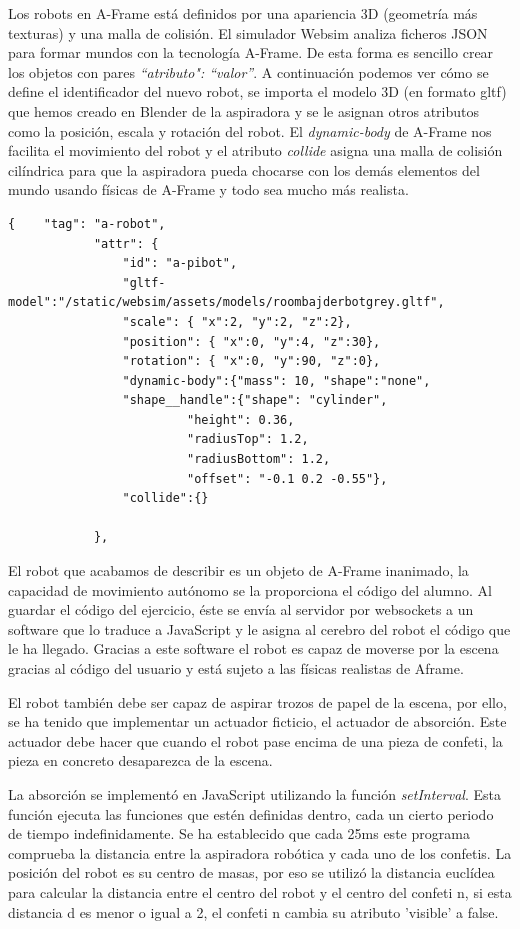 Los robots en A-Frame está definidos por una apariencia 3D (geometría más texturas) y una malla de colisión.
El simulador Websim analiza ficheros JSON para formar mundos con la tecnología A-Frame. De esta forma es sencillo crear los objetos con pares \textit{``atributo": ``valor''}. A continuación podemos ver cómo se define el identificador del nuevo robot, se importa el modelo 3D (en formato gltf) que hemos creado en Blender de la aspiradora y se le asignan otros atributos como la posición, escala y rotación del robot. El \textit{dynamic-body} de A-Frame nos facilita el movimiento del robot y el atributo \textit{collide} asigna una malla de colisión cilíndrica para que la aspiradora pueda chocarse con los demás elementos del mundo usando físicas de A-Frame y todo sea mucho más realista.


\begin{lstlisting}
{    "tag": "a-robot",
            "attr": {
                "id": "a-pibot",
                "gltf-model":"/static/websim/assets/models/roombajderbotgrey.gltf",
                "scale": { "x":2, "y":2, "z":2},
                "position": { "x":0, "y":4, "z":30},
                "rotation": { "x":0, "y":90, "z":0},
                "dynamic-body":{"mass": 10, "shape":"none",
                "shape__handle":{"shape": "cylinder",
                         "height": 0.36,
                         "radiusTop": 1.2,
                         "radiusBottom": 1.2,
                         "offset": "-0.1 0.2 -0.55"},
                "collide":{}

            },
\end{lstlisting}

El robot que acabamos de describir es un objeto de A-Frame inanimado, la capacidad de movimiento autónomo se la proporciona el código del alumno. Al guardar el código del ejercicio, éste se envía al servidor por websockets a un software que lo traduce a JavaScript y le asigna al cerebro del robot el código que le ha llegado. Gracias a este software el robot es capaz de moverse por la escena gracias al código del usuario y está sujeto a las físicas realistas de Aframe.

El robot también debe ser capaz de aspirar trozos de papel de la escena, por ello, se ha tenido que implementar un actuador ficticio, el actuador de absorción. Este actuador debe hacer que cuando el robot pase encima de una pieza de confeti, la pieza en concreto desaparezca de la escena.

La absorción se implementó en JavaScript utilizando la función \textit{setInterval}. Esta función ejecuta las funciones que estén definidas dentro, cada un cierto periodo de tiempo indefinidamente.
Se ha establecido que cada 25ms este programa comprueba la distancia entre la aspiradora robótica y cada uno de los confetis. La posición del robot es su centro de masas, por eso se  utilizó la distancia euclídea para calcular la distancia entre el centro del robot y el centro del confeti n, si esta distancia d es menor o igual a 2, el confeti n cambia su atributo 'visible' a false. 

